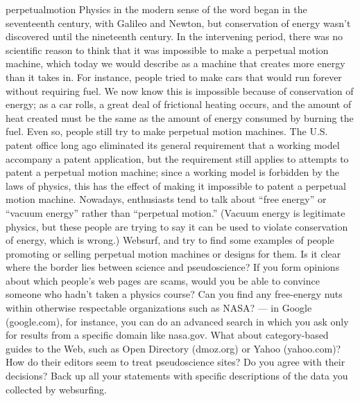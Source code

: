 \begin{hwsection}
\begin{hw}[2]{perpetualmotion}
Physics in the modern sense of the word began in the seventeenth century, with Galileo
and Newton, but conservation of energy wasn't discovered until the nineteenth century.
In the intervening period, there was no scientific reason to think that it was impossible
to make a perpetual motion machine, which today we would describe as a machine that
creates more energy than it takes in. For instance, people tried to make cars that would
run forever without requiring fuel. We now know this is impossible because of conservation
of energy; as a car rolls, a great deal of frictional heating occurs, and the amount of
heat created must be the same as the amount of energy consumed by burning the fuel.
Even so, people still try to make perpetual motion machines. The U.S. patent office long
ago eliminated its general requirement that a working model accompany a patent application, but the
requirement still applies to attempts to patent a perpetual motion machine; since a working
model is forbidden by the laws of physics, this has the effect of making it impossible to
patent a perpetual motion machine. Nowadays, enthusiasts tend to talk about ``free energy''
or ``vacuum energy'' 
rather than ``perpetual motion.'' 
(Vacuum energy is legitimate physics, but these people are trying to say
it can be used to violate conservation of energy, which is wrong.)
Websurf, and try to find some examples of people
promoting or selling perpetual motion machines or designs for them. Is it clear where the
border lies between science and pseudoscience? If you form opinions about which people's
web pages are scams, would you be able to convince someone who hadn't taken a physics
course? Can you find any free-energy nuts within otherwise respectable organizations such
as NASA? --- in Google (google.com), for instance, you can do an advanced search in which you ask only
for results from a specific domain like nasa.gov. What about category-based guides to the
Web, such as Open Directory (dmoz.org) or Yahoo (yahoo.com)? How do their editors seem to
treat pseudoscience sites? Do you agree with their decisions? Back up all your statements with
specific descriptions of the data you collected by websurfing.
\end{hw}




\end{hwsection}

